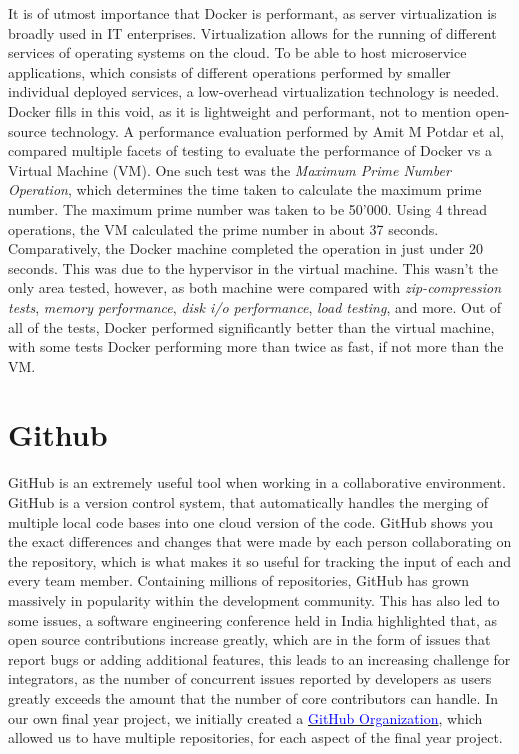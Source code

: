 It is of utmost importance that Docker is performant, as server virtualization is broadly used in IT enterprises. Virtualization allows for the running of different services of operating systems on the cloud. To be able to host microservice applications, which consists of different operations performed by smaller individual deployed services, a low-overhead virtualization technology is needed. Docker fills in this void, as it is lightweight and performant, not to mention open-source technology. A performance evaluation performed by Amit M Potdar et al, compared multiple facets of testing to evaluate the performance of Docker vs a Virtual Machine (VM). One such test was the \textit{Maximum Prime Number Operation}, which determines the time taken to calculate the maximum prime number. The maximum prime number was taken to be 50'000. Using 4 thread operations, the VM calculated the prime number in about 37 seconds. Comparatively, the Docker machine completed the operation in just under 20 seconds. This was due to the hypervisor in the virtual machine. This wasn't the only area tested, however, as both machine were compared with \textit{zip-compression tests}, \textit{memory performance}, \textit{disk i/o performance}, \textit{load testing}, and more. Out of all of the tests, Docker performed significantly better than the virtual machine, with some tests Docker performing more than twice as fast, if not more than the VM\cite{POTDAR20201419}.

\section{Github}

GitHub is an extremely useful tool when working in a collaborative environment. GitHub is a version control system, that automatically handles the merging of multiple local code bases into one cloud version of the code. GitHub shows you the exact differences and changes that were made by each person collaborating on the repository, which is what makes it so useful for tracking the input of each and every team member. Containing millions of repositories, GitHub has grown massively in popularity within the development community. This has also led to some issues, a software engineering conference held in India highlighted that, as open source contributions increase greatly, which are in the form of issues that report bugs or adding additional features, this leads to an increasing challenge for integrators, as the number of concurrent issues reported by developers as users greatly exceeds the amount that the number of core contributors can handle\cite{github_issues}. In our own final year project, we initially created a \href{https://docs.github.com/en/organizations/collaborating-with-groups-in-organizations/about-organizations}{\textcolor{blue}{GitHub Organization}}, which allowed us to have multiple repositories, for each aspect of the final year project.

